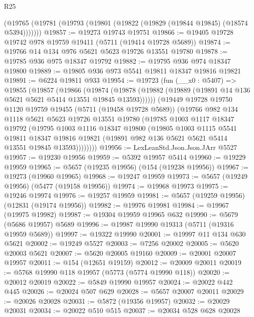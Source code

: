 \begin{lexlean}{R25}
\begin{coremodule}
    (@19765 (@19781 (@19793 (@19801 (@19822 (@19829 (@19844 @19845) (@18574 @5394)))))))
@19857 := @19273 @19743 @19751
@19866 := @19405 @19728 @19742 @978 @19759 @19411 (@5711 (@19414 @19728 @5689))
@19874 := @19766 @14 @134 @976 @5621 @5623 @19726 @13551 @19780
@19878 := @19785 @936 @975 @18347 @19792
@19882 := @19795 @936 @974 @18347 @19800
@19889 := @19805 @936 @973 @5541 @19811 @18347 @19816 @19821
@19891 := @6224 @19811 @933
@19954 := @19723
    (fun (__x0 : @5407) =>
    @19855
      (@19857
        (@19866
          (@19874
            (@19878 (@19882 (@19889 (@19891 @14 @136 @5621 @5621 @5414 @13551 @19845 @13593))))))
        (@19449
          @19728
          @19750
          @1120
          @19759
          @19455
          (@5711 (@19458 @19728 @5689))
          (@19766
            @982
            @134
            @1118
            @5621
            @5623
            @19726
            @13551
            @19780
            (@19785
              @1003
              @1117
              @18347
              @19792
              (@19795
                @1003
                @1116
                @18347
                @19800
                (@19805
                  @1003
                  @1115
                  @5541
                  @19811
                  @18347
                  @19816
                  @19821
                  (@19891 @982 @136 @5621 @5621 @5414 @13551 @19845 @13593))))))))
@19956 := LexLeanStd.Json.Json.JArr @5527
@19957 := @19230 @19956
@19959 := @5392 @19957 @5414
@19960 := @19229 @19959
@19965 := @5657 (@19235 @19956) (@154 (@19238 @19956))
@19967 := @19273 (@19960 @19965)
@19968 := @19247 @19959
@19973 := @5657 (@19249 @19956) (@5477 (@19158 @19956))
@19974 := @19968 @19973
@19975 := @19246 @19974
@19976 := @19257 @19959
@19981 := @5657 (@19259 @19956) (@12831 (@19174 @19956))
@19982 := @19976 @19981
@19984 := @19967 (@19975 @19982)
@19987 := @19304 @19959 @19965 @632
@19990 := @5679 (@5686 @19957) @5689
@19996 := @19987 @19990 @19313 (@5711 (@19316 @19959 @5689))
@19997 := @19322 @19990
@20001 := @19997 @11 @134 @630 @5621
@20002 := @19249 @5527
@20003 := @7256 @20002
@20005 := @5620 @20003 @5621
@20007 := @5620 @20005 @19160
@20009 := @20001 @20007 @19957
@20011 := @154 (@12651 @19159)
@20012 := @20009 @20011
@20019 := @5768 @19990 @118 @19957 (@5773 (@5774 @19990 @118))
@20020 := @20012 @20019
@20022 := @5849 @19990 @19957
@20024 := @20022 @442 @445
@20026 := @20024 @507 @629
@20028 := @5657 @20007 @20011
@20029 := @20026 @20028
@20031 := @5872 (@19356 @19957)
@20032 := @20029 @20031
@20034 := @20022 @510 @515
@20037 := @20034 @528 @628 @20028

\end{coremodule}
\end{lexlean}
